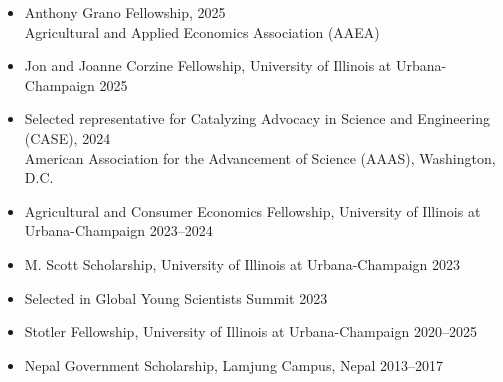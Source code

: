 \begin{itemize}[leftmargin = *]
\item Anthony Grano Fellowship, \hfill 2025\\
Agricultural and Applied Economics Association (AAEA)

\item Jon and Joanne Corzine Fellowship, University of Illinois at Urbana-Champaign \hfill 2025

\item Selected representative for Catalyzing Advocacy in Science and Engineering (CASE), \hfill 2024\\
American Association for the Advancement of Science (AAAS), Washington, D.C.

\item Agricultural and Consumer Economics Fellowship, University of Illinois at Urbana-Champaign \hfill 2023--2024

\item M. Scott Scholarship, University of Illinois at Urbana-Champaign \hfill 2023
    
\item Selected in Global Young Scientists Summit \hfill 2023
    
\item Stotler Fellowship, University of Illinois at Urbana-Champaign \hfill 2020--2025
    
\item Nepal Government Scholarship, Lamjung Campus, Nepal \hfill 2013--2017

\end{itemize}
